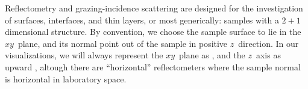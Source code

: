 Reflectometry and grazing-incidence scattering
are designed for the investigation of surfaces, interfaces, and thin layers,
or most generically:
samples with a $2+1$ dimensional structure.
By convention,
we choose the sample surface to lie in the $xy$~plane,
%
and its normal point out of the sample in positive $z$~direction.
%
%
%
%
%
%
%
In our visualizations, we will always represent the $xy$~plane as ,
and the $z$~axis as upward ,
altough there are ``horizontal'' reflectometers
where the sample normal is horizontal in laboratory space.
%

